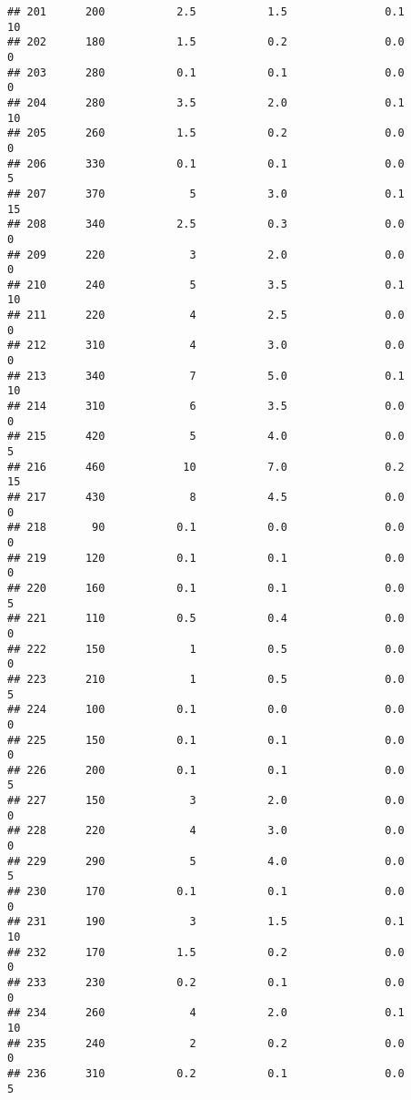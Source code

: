 \documentclass[
]{article}
\begin{document}
\begin{verbatim}
## 201      200           2.5           1.5               0.1          10
## 202      180           1.5           0.2               0.0           0
## 203      280           0.1           0.1               0.0           0
## 204      280           3.5           2.0               0.1          10
## 205      260           1.5           0.2               0.0           0
## 206      330           0.1           0.1               0.0           5
## 207      370             5           3.0               0.1          15
## 208      340           2.5           0.3               0.0           0
## 209      220             3           2.0               0.0           0
## 210      240             5           3.5               0.1          10
## 211      220             4           2.5               0.0           0
## 212      310             4           3.0               0.0           0
## 213      340             7           5.0               0.1          10
## 214      310             6           3.5               0.0           0
## 215      420             5           4.0               0.0           5
## 216      460            10           7.0               0.2          15
## 217      430             8           4.5               0.0           0
## 218       90           0.1           0.0               0.0           0
## 219      120           0.1           0.1               0.0           0
## 220      160           0.1           0.1               0.0           5
## 221      110           0.5           0.4               0.0           0
## 222      150             1           0.5               0.0           0
## 223      210             1           0.5               0.0           5
## 224      100           0.1           0.0               0.0           0
## 225      150           0.1           0.1               0.0           0
## 226      200           0.1           0.1               0.0           5
## 227      150             3           2.0               0.0           0
## 228      220             4           3.0               0.0           0
## 229      290             5           4.0               0.0           5
## 230      170           0.1           0.1               0.0           0
## 231      190             3           1.5               0.1          10
## 232      170           1.5           0.2               0.0           0
## 233      230           0.2           0.1               0.0           0
## 234      260             4           2.0               0.1          10
## 235      240             2           0.2               0.0           0
## 236      310           0.2           0.1               0.0           5

\end{verbatim}
\end{document}
